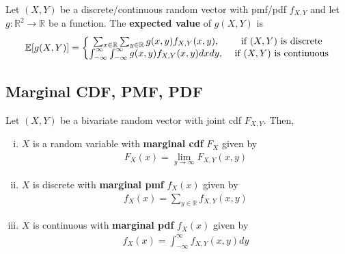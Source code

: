 \documentclass[11pt]{elegantbook}
\begin{document}
\begin{definition}
    \normalfont
    Let $(X,Y)$ be a discrete/continuous random vector with pmf/pdf $f_{X,Y}$ and let $g: \mathbb{R}^2 \rightarrow \mathbb{R}$ be a function. The \textbf{expected value} of $g(X,Y)$ is
    \begin{equation}
        \begin{aligned}
            \mathbb{E}[g(X,Y)]=\left\{\begin{matrix}
                \sum_{x\in \mathbb{R}}\sum_{y\in \mathbb{R}}g(x,y)f_{X,Y}(x,y),& \textnormal{ if $(X,Y)$ is discrete}\\
                \int_{-\infty}^\infty\int_{-\infty}^\infty g(x,y) f_{X,Y}(x,y) dx dy,&\textnormal{ if $(X,Y)$ is continuous}
            \end{matrix}\right.
        \end{aligned}
        \nonumber
    \end{equation}
\end{definition}

\subsection{Marginal CDF, PMF, PDF}

\begin{definition}
    \normalfont
    Let $(X,Y)$ be a bivariate random vector with joint cdf $F_{X,Y}$. Then,
    \begin{enumerate}[(i).]
        \item $X$ is a random variable with \textbf{marginal cdf} $F_X$ given by
        \begin{equation}
            \begin{aligned}
                F_X(x)=\lim_{y \rightarrow \infty}F_{X,Y}(x,y)
            \end{aligned}
            \nonumber
        \end{equation}
        \item $X$ is discrete with \textbf{marginal pmf} $f_X(x)$ given by
        \begin{equation}
            \begin{aligned}
                f_X(x)=\sum_{y\in \mathbb{R}}f_{X,Y}(x,y)
            \end{aligned}
            \nonumber
        \end{equation}
        \item $X$ is continuous with \textbf{marginal pdf} $f_X(x)$ given by
        \begin{equation}
            \begin{aligned}
                f_X(x)=\int_{-\infty}^\infty f_{X,Y}(x,y) dy
            \end{aligned}
            \nonumber
        \end{equation}
    \end{enumerate}
\end{definition}
\end{document}

